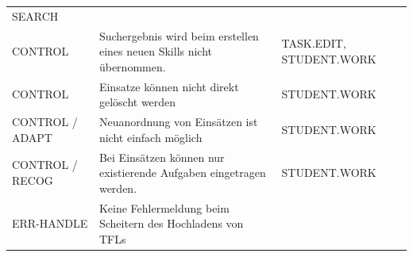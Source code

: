 \documentclass[
  12pt,
  ngerman,
  a4paper,
]{article}
\begin{document}
\begin{longtable}[]{@{}lll@{}}
\begin{minipage}[t]{0.23\columnwidth}
SEARCH\strut
\end{minipage}\tabularnewline
\begin{minipage}[t]{0.14\columnwidth}\raggedright
CONTROL\strut
\end{minipage} & \begin{minipage}[t]{0.55\columnwidth}\raggedright
Suchergebnis wird beim erstellen eines neuen Skills nicht
übernommen.\strut
\end{minipage} & \begin{minipage}[t]{0.23\columnwidth}\raggedright
TASK.EDIT, STUDENT.WORK\strut
\end{minipage}\tabularnewline
\begin{minipage}[t]{0.14\columnwidth}\raggedright
CONTROL\strut
\end{minipage} & \begin{minipage}[t]{0.55\columnwidth}\raggedright
Einsatze können nicht direkt gelöscht werden\strut
\end{minipage} & \begin{minipage}[t]{0.23\columnwidth}\raggedright
STUDENT.WORK\strut
\end{minipage}\tabularnewline
\begin{minipage}[t]{0.14\columnwidth}\raggedright
CONTROL / ADAPT\strut
\end{minipage} & \begin{minipage}[t]{0.55\columnwidth}\raggedright
Neuanordnung von Einsätzen ist nicht einfach möglich\strut
\end{minipage} & \begin{minipage}[t]{0.23\columnwidth}\raggedright
STUDENT.WORK\strut
\end{minipage}\tabularnewline
\begin{minipage}[t]{0.14\columnwidth}\raggedright
CONTROL / RECOG\strut
\end{minipage} & \begin{minipage}[t]{0.55\columnwidth}\raggedright
Bei Einsätzen können nur existierende Aufgaben eingetragen werden.\strut
\end{minipage} & \begin{minipage}[t]{0.23\columnwidth}\raggedright
STUDENT.WORK\strut
\end{minipage}\tabularnewline
\begin{minipage}[t]{0.14\columnwidth}\raggedright
ERR-HANDLE\strut
\end{minipage} & \begin{minipage}[t]{0.55\columnwidth}\raggedright
Keine Fehlermeldung beim Scheitern des Hochladens von TFLs\strut

\end{minipage}
\end{longtable}
\end{document}
